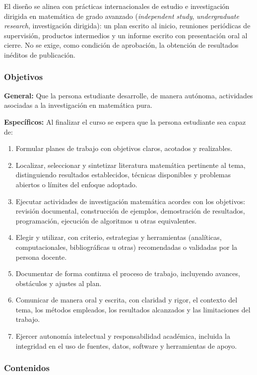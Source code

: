 \begin{refsection}
El diseño se alinea con prácticas internacionales de estudio e investigación dirigida en matemática de grado avanzado (\emph{independent study}, \emph{undergraduate research}, investigación dirigida): un plan escrito al inicio, reuniones periódicas de supervisión, productos intermedios y un informe escrito con presentación oral al cierre. No se exige, como condición de aprobación, la obtención de resultados inéditos de publicación.

\subsubsection*{Objetivos}

\textbf{General:} Que la persona estudiante desarrolle, de manera autónoma, actividades asociadas a la investigación en matemática pura.

\textbf{Específicos:} Al finalizar el curso se espera que la persona estudiante sea capaz de:

\begin{enumerate}
\item Formular planes de trabajo con objetivos claros, acotados y realizables.
\item Localizar, seleccionar y sintetizar literatura matemática pertinente al tema, distinguiendo resultados establecidos, técnicas disponibles y problemas abiertos o límites del enfoque adoptado.
\item Ejecutar actividades de investigación matemática acordes con los objetivos: revisión documental, construcción de ejemplos, demostración de resultados, programación, ejecución de algoritmos u otras equivalentes.
\item Elegir y utilizar, con criterio, estrategias y herramientas (analíticas, computacionales, bibliográficas u otras) recomendadas o validadas por la persona docente.
\item Documentar de forma continua el proceso de trabajo, incluyendo avances, obstáculos y ajustes al plan.
\item Comunicar de manera oral y escrita, con claridad y rigor, el contexto del tema, los métodos empleados, los resultados alcanzados y las limitaciones del trabajo.
\item Ejercer autonomía intelectual y responsabilidad académica, incluida la integridad en el uso de fuentes, datos, software y herramientas de apoyo.
\end{enumerate}

\subsubsection*{Contenidos}


\end{refsection}
